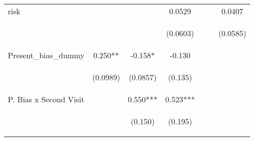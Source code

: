 \begin{center}
\begin{tabular}{lcccccc}
risk &  &  & 0.0529 &  &  & 0.0407 \\
\vspace{4pt} & \begin{footnotesize}\end{footnotesize} & \begin{footnotesize}\end{footnotesize} & \begin{footnotesize}(0.0603)\end{footnotesize} & \begin{footnotesize}\end{footnotesize} & \begin{footnotesize}\end{footnotesize} & \begin{footnotesize}(0.0585)\end{footnotesize} \\
Present\_bias\_dummy & 0.250** & -0.158* & -0.130 &  &  &  \\
\vspace{4pt} & \begin{footnotesize}(0.0989)\end{footnotesize} & \begin{footnotesize}(0.0857)\end{footnotesize} & \begin{footnotesize}(0.135)\end{footnotesize} & \begin{footnotesize}\end{footnotesize} & \begin{footnotesize}\end{footnotesize} & \begin{footnotesize}\end{footnotesize} \\
P. Bias x Second Visit &  & 0.550*** & 0.523*** &  &  &  \\
\vspace{4pt} & \begin{footnotesize}\end{footnotesize} & \begin{footnotesize}(0.150)\end{footnotesize} & \begin{footnotesize}(0.195)\end{footnotesize} & \begin{footnotesize}\end{footnotesize} & \begin{footnotesize}\end{footnotesize} & \begin{footnotesize}\end{footnotesize} \\

\end{tabular}
\end{center}
